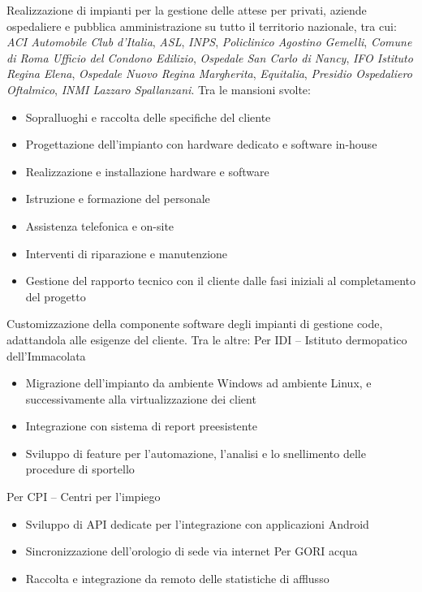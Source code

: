 \documentclass[a4paper, 11pt]{moderncv}
\begin{document}
\vspace{10pt}
        {Realizzazione di impianti per la gestione delle attese per privati, aziende ospedaliere e pubblica 
          amministrazione su tutto il territorio nazionale, tra cui: \emph{ACI Automobile Club d'Italia}, \emph{ASL}, \emph{INPS}, \emph{Policlinico Agostino Gemelli}, \emph{Comune di Roma Ufficio del Condono Edilizio}, \emph{Ospedale San Carlo di Nancy}, \emph{IFO Istituto Regina Elena}, \emph{Ospedale Nuovo Regina Margherita}, \emph{Equitalia}, \emph{Presidio Ospedaliero Oftalmico}, \emph{INMI Lazzaro Spallanzani}.
          \vspace{10pt}
          Tra le mansioni svolte:
          \begin{itemize}
          \item Sopralluoghi e raccolta delle specifiche del cliente
          \item Progettazione dell'impianto con hardware dedicato e software in-house
          \item Realizzazione e installazione hardware e software
          \item Istruzione e formazione del personale
          \item Assistenza telefonica e on-site
          \item Interventi di riparazione e manutenzione
          \item Gestione del rapporto tecnico con il cliente dalle fasi iniziali al completamento del progetto
          \end{itemize}
          \vspace{10pt}
          Customizzazione della componente software degli impianti di gestione code, adattandola alle esigenze del cliente. Tra le altre:
          Per IDI – Istituto dermopatico dell'Immacolata
          \begin{itemize}
          \item Migrazione dell'impianto da ambiente Windows ad ambiente Linux, e successivamente alla virtualizzazione dei client
          \item Integrazione con sistema di report preesistente
          \item Sviluppo di feature per l'automazione, l'analisi e lo snellimento delle procedure di sportello
          \end{itemize}
          Per CPI – Centri per l'impiego
          \begin{itemize}
          \item Sviluppo di API dedicate per l'integrazione con applicazioni Android
          \item Sincronizzazione dell'orologio di sede via internet
            Per GORI acqua
          \item Raccolta e integrazione da remoto delle statistiche di afflusso
        \end{itemize}}
\end{document}
